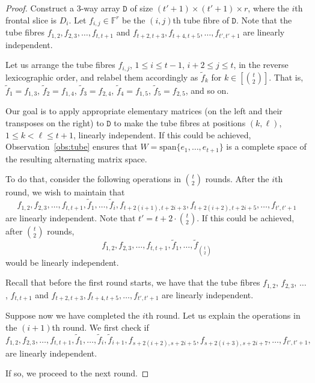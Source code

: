 \documentclass[10pt]{article}
\newcommand{\tens}[1]{\mathtt{#1}}
\newcommand{\F}{\mathbb{F}}
\renewcommand{\span}{\mathrm{span}}
\newcommand{\tD}{\tens{D}}
\begin{document}
%
%
%
%
%
%
\begin{proof}
Construct a $3$-way array $\tD$ of size $(t'+1)\times(t'+1)\times r$, where the 
$i$th frontal slice is $D_i$. Let $f_{i,j}\in\F^r$ be the $(i, j)$th tube fibre of 
$\tD$. Note that the tube fibres $f_{1, 2}, f_{2,3}, \dots, f_{t, t+1}$ and 
$f_{t+2, t+3}, f_{t+4, t+5}, \dots, f_{t', t'+1}$ are linearly 
independent. 


Let us arrange the tube fibres $f_{i,j}$, $1\leq i\leq t-1$, $i+2\leq j\leq t$, in 
the reverse lexicographic order, and relabel them accordingly as $\tilde f_k$ for 
$k\in[\binom{t}{2}]$. That is, $\tilde f_1=f_{1,3}$, $\tilde f_2=f_{1,4}$, $\tilde 
f_3=f_{2, 4}$, $\tilde f_4=f_{1, 5}$, $\tilde f_5=f_{2,5}$, and so on.

%
%
Our goal is to apply appropriate elementary matrices (on the left and their 
transposes on the right) to $\tD$ to make the tube 
fibres at positions $(k, \ell)$, $1\leq k<\ell\leq t+1$, linearly independent.
If this could 
be achieved, Observation~\ref{obs:tube} ensures that $W=\span\{ e_1, \dots,
e_{t+1}\}$ is a complete space of the resulting alternating matrix space.

To do that, consider the following operations in $\binom{t}{2}$ rounds. After the 
$i$th round, we wish to maintain that 
$$f_{1, 2}, f_{2,3}, \dots, f_{t, t+1}, \tilde f_1, 
\dots, \tilde f_i, f_{t+2(i+1), t+2i+3}, f_{t+2(i+2), t+2i+5}, \dots, f_{t', 
t'+1}$$
are linearly 
independent. Note that $t'=t+2\cdot \binom{t}{2}$. If this could be achieved, 
after $\binom{t}{2}$ rounds, 
$$f_{1,2}, f_{2,3}, \dots, f_{t, t+1}, \tilde f_1, \dots, \tilde 
f_{\binom{t}{2}}$$ 
would be linearly independent.

Recall that before the first round starts, we have that the tube fibres $f_{1, 
2}$, 
$f_{2,3}$, $\dots$, $f_{t, t+1}$ and 
$f_{t+2, t+3}, f_{t+4, t+5}, \dots, f_{t', t'+1}$ are linearly 
independent. 

Suppose now we have completed the $i$th round. Let us explain the operations in 
the 
$(i+1)$th round. We first check if 
$$f_{1, 
2}, f_{2,3}, \dots, f_{t, t+1}, \tilde f_1, 
\dots, \tilde f_i, \tilde f_{i+1}, f_{s+2(i+2), s+2i+5}, 
f_{s+2(i+3), s+2i+7}, \dots, f_{t', 
t'+1},$$ 
are linearly independent. 

If so, we proceed to the next round. 


\end{proof}
\end{document}
